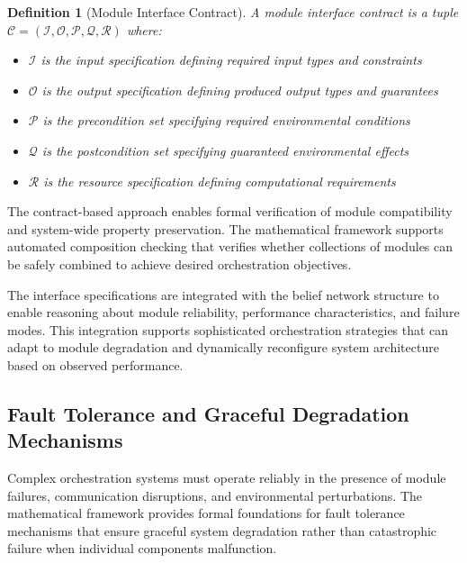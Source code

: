 \documentclass[12pt,a4paper]{article}
\newtheorem{definition}[theorem]{Definition}
\begin{document}
\begin{definition}[Module Interface Contract]
A module interface contract is a tuple $\mathcal{C} = (\mathcal{I}, \mathcal{O}, \mathcal{P}, \mathcal{Q}, \mathcal{R})$ where:
\begin{itemize}
\item $\mathcal{I}$ is the input specification defining required input types and constraints
\item $\mathcal{O}$ is the output specification defining produced output types and guarantees
\item $\mathcal{P}$ is the precondition set specifying required environmental conditions
\item $\mathcal{Q}$ is the postcondition set specifying guaranteed environmental effects
\item $\mathcal{R}$ is the resource specification defining computational requirements
\end{itemize}
\end{definition}

The contract-based approach enables formal verification of module compatibility and system-wide property preservation. The mathematical framework supports automated composition checking that verifies whether collections of modules can be safely combined to achieve desired orchestration objectives.

The interface specifications are integrated with the belief network structure to enable reasoning about module reliability, performance characteristics, and failure modes. This integration supports sophisticated orchestration strategies that can adapt to module degradation and dynamically reconfigure system architecture based on observed performance.

\subsection{Fault Tolerance and Graceful Degradation Mechanisms}

Complex orchestration systems must operate reliably in the presence of module failures, communication disruptions, and environmental perturbations. The mathematical framework provides formal foundations for fault tolerance mechanisms that ensure graceful system degradation rather than catastrophic failure when individual components malfunction.
\end{document}
